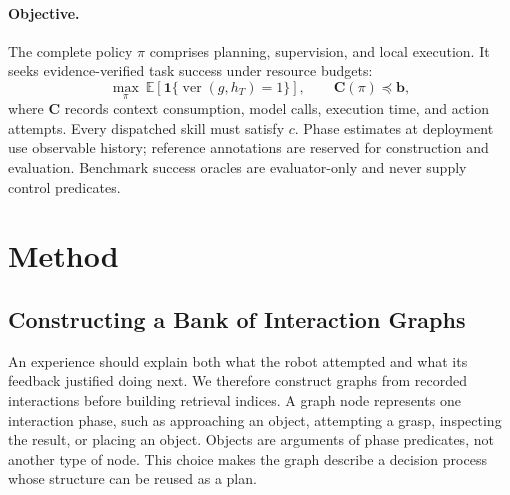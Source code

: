 \documentclass[10pt,twocolumn,letterpaper]{article}
\begin{document}
\paragraph{Objective.}
The complete policy $\pi$ comprises planning, supervision, and local execution. It seeks evidence-verified task success under resource budgets:
\begin{equation}
\max_{\pi}\ \mathbb E\!\left[\mathbf 1\{\operatorname{ver}(g,h_T)=1\}\right],
\qquad \mathbf C(\pi)\preceq\mathbf b,
\label{eq:objective}
\end{equation}
where $\mathbf C$ records context consumption, model calls, execution time, and action attempts. Every dispatched skill must satisfy $c$. Phase estimates at deployment use observable history; reference annotations are reserved for construction and evaluation. Benchmark success oracles are evaluator-only and never supply control predicates.


\section{Method}
\label{sec:method}

\subsection{Constructing a Bank of Interaction Graphs}
\label{sec:construction}

An experience should explain both what the robot attempted and what its feedback justified doing next. We therefore construct graphs from recorded interactions before building retrieval indices. A graph node represents one interaction phase, such as approaching an object, attempting a grasp, inspecting the result, or placing an object. Objects are arguments of phase predicates, not another type of node. This choice makes the graph describe a decision process whose structure can be reused as a plan.
\end{document}
